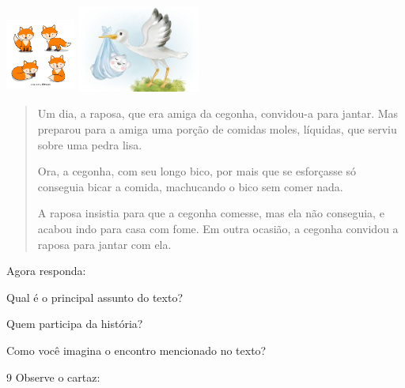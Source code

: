 \includegraphics[width=0.90625in,height=0.98597in]{media/image121.jpeg}
\includegraphics[width=1.57292in,height=1.12292in]{media/image122.jpeg}

\begin{quote}
Um dia, a raposa, que era amiga da cegonha, convidou-a para jantar. Mas
preparou para a amiga uma porção de comidas moles, líquidas, que serviu
sobre uma pedra lisa.

Ora, a cegonha, com seu longo bico, por mais que se esforçasse só
conseguia bicar a comida, machucando o bico sem comer nada.

A raposa insistia para que a cegonha comesse, mas ela não conseguia, e
acabou indo para casa com fome. Em outra ocasião, a cegonha convidou a
raposa para jantar com ela.
\end{quote}


Agora responda:

\begin{escolha}
\item Qual é o principal assunto do texto?


\item Quem participa da história?


\item Como você imagina o encontro mencionado no texto? %

\end{escolha}

\num{9} Observe o cartaz:

